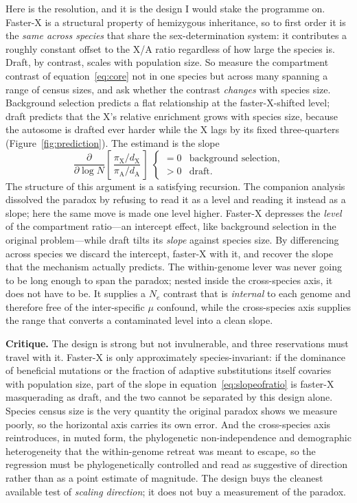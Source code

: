 \documentclass[11pt,a4paper]{article}
\newcommand{\Ne}{N_{e}}
\begin{document}
Here is the resolution, and it is the design I would stake the programme on. Faster-X is a structural property of hemizygous inheritance, so to first order it is the \emph{same across species} that share the sex-determination system: it contributes a roughly constant offset to the X/A ratio regardless of how large the species is. Draft, by contrast, scales with population size. So measure the compartment contrast of equation~\eqref{eq:core} not in one species but across many spanning a range of census sizes, and ask whether the contrast \emph{changes} with species size. Background selection predicts a flat relationship at the faster-X-shifted level; draft predicts that the X's relative enrichment grows with species size, because the autosome is drafted ever harder while the X lags by its fixed three-quarters (Figure~\ref{fig:prediction}). The estimand is the slope
\begin{equation}
    \frac{\partial}{\partial \log N}\!\left[\,\frac{\pi_{\mathrm X}/d_{\mathrm X}}{\pi_{\mathrm A}/d_{\mathrm A}}\,\right]
    \;\begin{cases} = 0 & \text{background selection,}\\ > 0 & \text{draft.}\end{cases}
    \label{eq:slopeofratio}
\end{equation}
The structure of this argument is a satisfying recursion. The companion analysis dissolved the paradox by refusing to read it as a level and reading it instead as a slope; here the same move is made one level higher. Faster-X depresses the \emph{level} of the compartment ratio---an intercept effect, like background selection in the original problem---while draft tilts its \emph{slope} against species size. By differencing across species we discard the intercept, faster-X with it, and recover the slope that the mechanism actually predicts. The within-genome lever was never going to be long enough to span the paradox; nested inside the cross-species axis, it does not have to be. It supplies a $\Ne$ contrast that is \emph{internal} to each genome and therefore free of the inter-specific $\mu$ confound, while the cross-species axis supplies the range that converts a contaminated level into a clean slope.

\textbf{Critique.} The design is strong but not invulnerable, and three reservations must travel with it. Faster-X is only approximately species-invariant: if the dominance of beneficial mutations or the fraction of adaptive substitutions itself covaries with population size, part of the slope in equation~\eqref{eq:slopeofratio} is faster-X masquerading as draft, and the two cannot be separated by this design alone. Species census size is the very quantity the original paradox shows we measure poorly, so the horizontal axis carries its own error. And the cross-species axis reintroduces, in muted form, the phylogenetic non-independence and demographic heterogeneity that the within-genome retreat was meant to escape, so the regression must be phylogenetically controlled and read as suggestive of direction rather than as a point estimate of magnitude. The design buys the cleanest available test of \emph{scaling direction}; it does not buy a measurement of the paradox.
\end{document}
